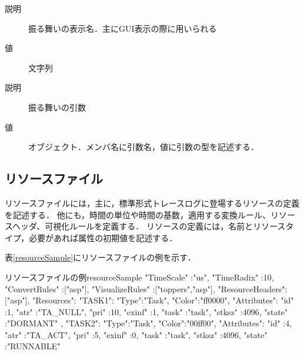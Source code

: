 \begin{description}
\begin{description}
            \begin{description}
            \setlength{\itemsep}{-1.5\itemsep}
            {\nopagebreak
            \item[\texttt{DisplayName}] \mbox{}
            \vspace{-0.25zw}
                \begin{description}
                \item[説明] 振る舞いの表示名．主にGUI表示の際に用いられる
                \item[値] 文字列
                \end{description}
            }{\nopagebreak
            \item[\texttt{Arguments}] \mbox{}
            \vspace{-0.25zw}
                \begin{description}
                \item[説明] 振る舞いの引数
                \item[値] オブジェクト．メンバ名に引数名，値に引数の型を記述する．
                \end{description}
            }
            \end{description}
    \end{description}
\end{description}

\subsection{リソースファイル}
\label{subsec:resFile}

リソースファイルには，主に，標準形式トレースログに登場するリソースの定義を記述する．
他にも，時間の単位や時間の基数，適用する変換ルール、リソースヘッダ、可視化ルールを定義する．
リソースの定義には，名前とリソースタイプ，必要があれば属性の初期値を記述する．

表\ref{resourceSample}にリソースファイルの例を示す．

\begin{File}{リソースファイルの例}{resourceSample}
{
  "TimeScale" :"us",
  "TimeRadix" :10,
  "ConvertRules"   :["asp"],
  "VisualizeRules" :["toppers","asp"],
  "ResourceHeaders":["asp"],
  "Resources":{
    "TASK1":{
      "Type":"Task",
      "Color":"ff0000",
      "Attributes":{
        "id"    :1,
        "atr"   :"TA_NULL",
        "pri"   :10,
        "exinf" :1,
        "task"  :"task",
        "stksz" :4096,
        "state" :"DORMANT"
      }
    },
    "TASK2":{
      "Type":"Task",
      "Color":"00ff00",
      "Attributes":{
        "id"    :4,
        "atr"   :"TA_ACT",
        "pri"   :5,
        "exinf" :0,
        "task"  :"task",
        "stksz" :4096,
        "state" :"RUNNABLE"
      }
    }
  }
}
\end{File}

